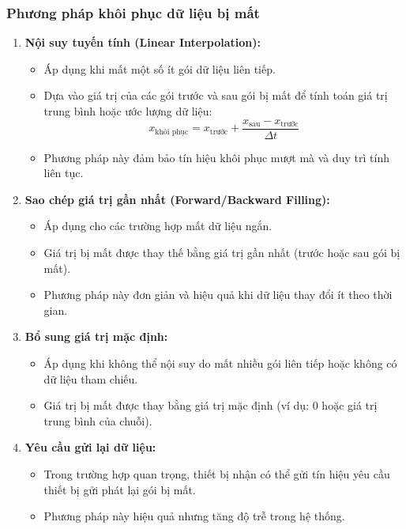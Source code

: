 \subsubsection{Phương pháp khôi phục dữ liệu bị mất}
\begin{enumerate}
    \item \textbf{Nội suy tuyến tính (Linear Interpolation):}
    \begin{itemize}
        \item Áp dụng khi mất một số ít gói dữ liệu liên tiếp.
        \item Dựa vào giá trị của các gói trước và sau gói bị mất để tính toán giá trị trung bình hoặc ước lượng dữ liệu:
        \[
        x_{\text{khôi phục}} = x_{\text{trước}} + \frac{x_{\text{sau}} - x_{\text{trước}}}{\Delta t}
        \]
        \item Phương pháp này đảm bảo tín hiệu khôi phục mượt mà và duy trì tính liên tục.
    \end{itemize}
    
    \item \textbf{Sao chép giá trị gần nhất (Forward/Backward Filling):}
    \begin{itemize}
        \item Áp dụng cho các trường hợp mất dữ liệu ngắn.
        \item Giá trị bị mất được thay thế bằng giá trị gần nhất (trước hoặc sau gói bị mất).
        \item Phương pháp này đơn giản và hiệu quả khi dữ liệu thay đổi ít theo thời gian.
    \end{itemize}
    
    \item \textbf{Bổ sung giá trị mặc định:}
    \begin{itemize}
        \item Áp dụng khi không thể nội suy do mất nhiều gói liên tiếp hoặc không có dữ liệu tham chiếu.
        \item Giá trị bị mất được thay bằng giá trị mặc định (ví dụ: 0 hoặc giá trị trung bình của chuỗi).
    \end{itemize}
    
    \item \textbf{Yêu cầu gửi lại dữ liệu:}
    \begin{itemize}
        \item Trong trường hợp quan trọng, thiết bị nhận có thể gửi tín hiệu yêu cầu thiết bị gửi phát lại gói bị mất.
        \item Phương pháp này hiệu quả nhưng tăng độ trễ trong hệ thống.
    \end{itemize}
\end{enumerate}

